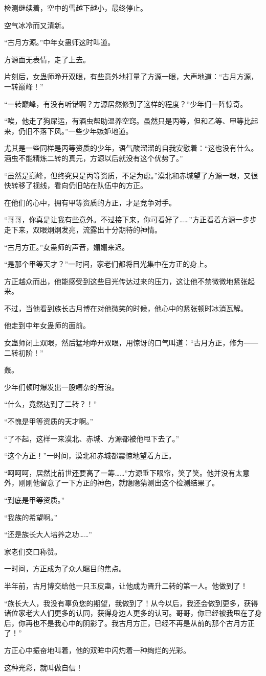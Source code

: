 \begin{this_body}
检测继续着，空中的雪越下越小，最终停止。

空气冰冷而又清新。

“古月方源。”中年女蛊师这时叫道。

方源面无表情，走了上去。

片刻后，女蛊师睁开双眼，有些意外地打量了方源一眼，大声地道：“古月方源，一转巅峰！”

“一转巅峰，有没有听错啊？方源居然修到了这样的程度？”少年们一阵惊奇。

“唉，他走了狗屎运，有酒虫帮助温养空窍。虽然只是丙等，但和乙等、甲等比起来，仍旧不落下风。”一些少年嫉妒地道。

尤其是一些同样是丙等资质的少年，语气酸溜溜的自我安慰着：“这也没有什么。酒虫不能精炼二转的真元，方源以后就没有这个优势了。”

“虽然是巅峰，但终究只是丙等资质，不足为虑。”漠北和赤城望了方源一眼，又很快转移了视线，看向仍旧站在队伍中的方正。

在他们的心中，拥有甲等资质的方正，才是竞争对手。

“哥哥，你真是让我有些意外。不过接下来，你可看好了……”方正看着方源一步步走下来，双眼炯炯发亮，流露出十分期待的神情。

“古月方正。”女蛊师的声音，姗姗来迟。

“是那个甲等天才？”一时间，家老们都将目光集中在方正的身上。

方正越众而出，他能感受到这些目光传达过来的压力，这让他不禁微微地紧张起来。

不过，当他看到族长古月博在对他微笑的时候，他心中的紧张顿时冰消瓦解。

他走到中年女蛊师的面前。

女蛊师闭上双眼，然后猛地睁开双眼，用惊讶的口气叫道：“古月方正，修为——二转初阶！”

轰。

少年们顿时爆发出一股嘈杂的音浪。

“什么，竟然达到了二转？！”

“不愧是甲等资质的天才啊。”

“了不起，这样一来漠北、赤城、方源都被他甩下去了。”

“这个方正！”一时间，漠北和赤城都震惊地望着方正。

“呵呵呵，居然比前世还要高了一筹……”方源垂下眼帘，笑了笑。他并没有太意外，刚刚他留意了一下方正的神色，就隐隐猜测出这个检测结果了。

“到底是甲等资质。”

“我族的希望啊。”

“还是族长大人培养之功……”

家老们交口称赞。

一时间，方正成为了众人瞩目的焦点。

半年前，古月博交给他一只玉皮蛊，让他成为晋升二转的第一人。他做到了！

“族长大人，我没有辜负您的期望，我做到了！从今以后，我还会做到更多，获得诸位家老大人们更多的认同，获得身边人更多的认可。哥哥，你已经被我甩在了身后，你再也不是我心中的阴影了。我古月方正，已经不再是从前的那个古月方正了！”

方正心中振奋地叫着，他的双眸中闪灼着一种绚烂的光彩。

这种光彩，就叫做自信！

\end{this_body}

